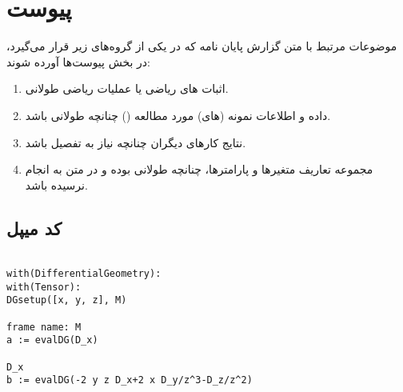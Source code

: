 \chapter*{‌پیوست}
موضوعات مرتبط با متن گزارش پایان نامه كه در يكی از گروه‌های زير قرار می‌گيرد، در بخش پيوست‌ها آورده شوند:
\begin{enumerate}
\item  اثبات های رياضی يا عمليات رياضی طولانی‌.‌
\item داده و اطلاعات نمونه (های) مورد مطالعه () چنانچه طولانی باشد‌.‌
\item نتايج كارهای ديگران چنانچه نياز به تفصيل باشد‌.‌
\item مجموعه تعاريف متغيرها و پارامترها، چنانچه طولانی بوده و در متن به انجام نرسيده باشد‌.‌
\end{enumerate}
\section*{کد میپل }
\begin{latin}
\begin{verbatim}

with(DifferentialGeometry):
with(Tensor):
DGsetup([x, y, z], M)
																	frame name: M
a := evalDG(D_x)
																	D_x
b := evalDG(-2 y z D_x+2 x D_y/z^3-D_z/z^2)


\end{verbatim}
\end{latin}